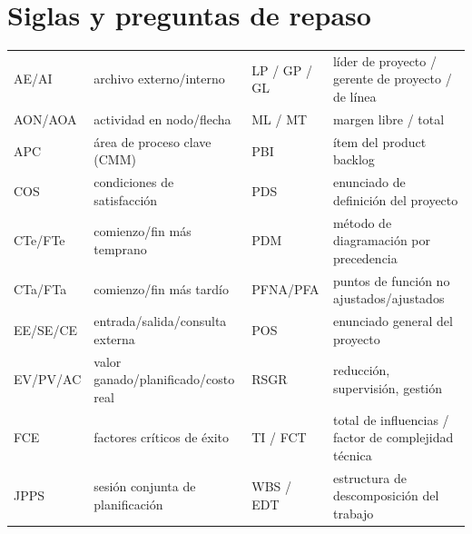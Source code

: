 \documentclass[11pt,a4paper]{article}
\begin{document}
\section{Siglas y preguntas de repaso}
\begin{center}\scriptsize
\begin{tabular}{@{}ll@{\quad}ll@{}}
\toprule
AE/AI & archivo externo/interno & LP / GP / GL & líder de proyecto / gerente de proyecto / de línea\\
AON/AOA & actividad en nodo/flecha & ML / MT & margen libre / total\\
APC & área de proceso clave (CMM) & PBI & ítem del product backlog\\
COS & condiciones de satisfacción & PDS & enunciado de definición del proyecto\\
CTe/FTe & comienzo/fin más temprano & PDM & método de diagramación por precedencia\\
CTa/FTa & comienzo/fin más tardío & PFNA/PFA & puntos de función no ajustados/ajustados\\
EE/SE/CE & entrada/salida/consulta externa & POS & enunciado general del proyecto\\
EV/PV/AC & valor ganado/planificado/costo real & RSGR & reducción, supervisión, gestión\\
FCE & factores críticos de éxito & TI / FCT & total de influencias / factor de complejidad técnica\\
JPPS & sesión conjunta de planificación & WBS / EDT & estructura de descomposición del trabajo\\
\bottomrule
\end{tabular}
\end{center}
\end{document}
